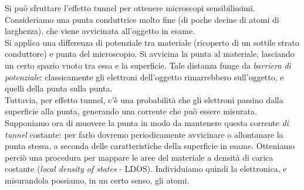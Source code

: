 \documentclass[../../FisicaTeorica.tex]{subfiles}
\begin{document}
\begin{itemize}
Si può sfruttare l'effetto tunnel per ottenere microscopi sensibilissimi.\\
Consideriamo una punta conduttrice molto fine (di poche decine di atomi di larghezza), che viene avvicinata all'oggetto in esame.\\
Si applica una differenza di potenziale tra materiale (ricoperto di un sottile strato conduttore) e punta del microscopio. Si avvicina la punta al materiale, lasciando un certo spazio vuoto tra essa e la superficie. Tale distanza funge da \textit{barriera di potenziale}: classicamente gli elettroni dell'oggetto rimarrebbero sull'oggetto, e quelli della punta sulla punta.\\
Tuttavia, per effetto tunnel, c'è una probabilità che gli elettroni passino dalla superficie alla punta, generando una corrente che può essere misurata.\\
Supponiamo ora di muovere la punta in modo da mantenere questa corrente \textit{di tunnel} costante: per farlo dovremo periodicamente avvicinare o allontanare la punta stessa, a seconda delle caratteristiche della superficie in esame. Otteniamo perciò una procedura per mappare le aree del materiale a densità di carica costante (\textit{local density of states} - LDOS). Individuiamo quindi la  elettronica, e misurandola possiamo, in un certo senso,  gli atomi.
\end{itemize}
\end{document}
